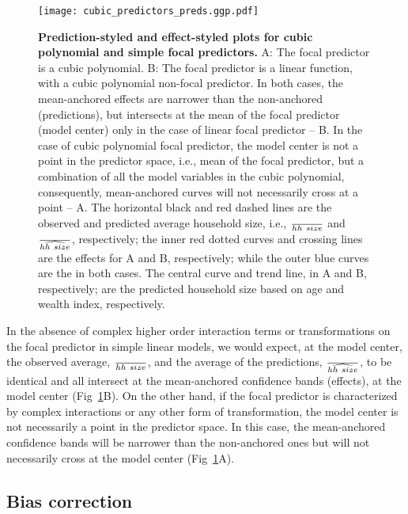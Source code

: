 \begin{figure}
\begin{center}
\texttt{[image: cubic\_predictors\_preds.ggp.pdf]}
\end{center}
\caption{{\bf Prediction-styled and effect-styled plots for cubic polynomial and simple focal predictors.} A: The focal predictor is a cubic polynomial. B: The focal predictor is a linear function, with a cubic polynomial non-focal predictor. In both cases, the mean-anchored effects are narrower than the non-anchored (predictions), but intersects at the mean of the focal predictor (model center) only in the case of linear focal predictor -- B. In the case of cubic polynomial focal predictor, the model center is not a point in the predictor space, i.e., mean of the focal predictor, but a combination of all the model variables in the cubic polynomial, consequently, mean-anchored curves will not necessarily cross at a point -- A. The horizontal black and red dashed lines are the observed and predicted average household size, i.e., $\over{hh~size}$ and $\over{\widehat{hh~size}}$, respectively; the inner red dotted curves and crossing lines are the effects for A and B, respectively; while the outer blue curves are the  in both cases. The central curve and trend line, in A and B, respectively; are the predicted household size based on age and wealth index, respectively. }
\label{fig:pred_cubic_plots}
\end{figure}

In the absence of complex higher order interaction terms or transformations on the focal predictor in simple linear models, we would expect, at the model center, the observed average, $\over{hh~size}$, and the average of the predictions, $\over{\widehat{hh~size}}$, to be identical and all intersect at the mean-anchored confidence bands (effects), at the model center (Fig~\ref{fig:pred_cubic_plots}B). On the other hand, if the focal predictor is characterized by complex interactions or any other form of transformation, the model center is not necessarily a point in the predictor space. In this case, the mean-anchored confidence bands will be narrower than the non-anchored ones but will not necessarily cross at the model center (Fig~\ref{fig:pred_cubic_plots}A).

\subsection{Bias correction}

